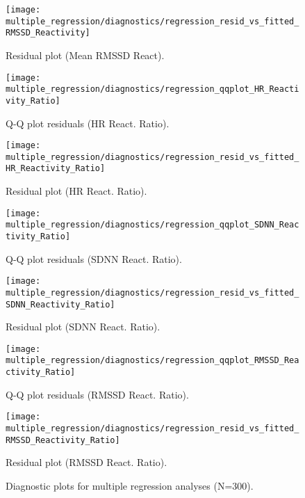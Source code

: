 \documentclass[11pt, a4paper]{report}
\begin{document}
\begin{figure}[H]
\begin{minipage}{0.48\textwidth}
        \label{fig:qq_rmssd_results}
    \end{minipage}\hfill
    \begin{minipage}{0.48\textwidth}
        \texttt{[image: multiple\_regression/diagnostics/regression\_resid\_vs\_fitted\_RMSSD\_Reactivity]}
        \caption{Residual plot (Mean RMSSD React).}
        \label{fig:resid_rmssd_results}
    \end{minipage}
    \vspace{\floatsep}
    \begin{minipage}{0.48\textwidth}
        \texttt{[image: multiple\_regression/diagnostics/regression\_qqplot\_HR\_Reactivity\_Ratio]}
        \caption{Q-Q plot residuals (HR React. Ratio).}
        \label{fig:qq_hrratio_results}
    \end{minipage}\hfill
    \begin{minipage}{0.48\textwidth}
        \texttt{[image: multiple\_regression/diagnostics/regression\_resid\_vs\_fitted\_HR\_Reactivity\_Ratio]}
        \caption{Residual plot (HR React. Ratio).}
        \label{fig:resid_hrratio_results}
    \end{minipage}
    \vspace{\floatsep}
    \begin{minipage}{0.48\textwidth}
        \texttt{[image: multiple\_regression/diagnostics/regression\_qqplot\_SDNN\_Reactivity\_Ratio]}
        \caption{Q-Q plot residuals (SDNN React. Ratio).}
        \label{fig:qq_sdnnratio_results}
    \end{minipage}\hfill
    \begin{minipage}{0.48\textwidth}
        \texttt{[image: multiple\_regression/diagnostics/regression\_resid\_vs\_fitted\_SDNN\_Reactivity\_Ratio]}
        \caption{Residual plot (SDNN React. Ratio).}
        \label{fig:resid_sdnnratio_results}
    \end{minipage}
        \vspace{\floatsep}
    \begin{minipage}{0.48\textwidth}
        \texttt{[image: multiple\_regression/diagnostics/regression\_qqplot\_RMSSD\_Reactivity\_Ratio]}
        \caption{Q-Q plot residuals (RMSSD React. Ratio).}
        \label{fig:qq_rmssdratio_results}
    \end{minipage}\hfill
    \begin{minipage}{0.48\textwidth}
        \texttt{[image: multiple\_regression/diagnostics/regression\_resid\_vs\_fitted\_RMSSD\_Reactivity\_Ratio]}
        \caption{Residual plot (RMSSD React. Ratio).}
        \label{fig:resid_rmssdratio_results}
    \end{minipage}
    \caption{Diagnostic plots for multiple regression analyses (N=300).}
\end{figure}
\end{document}
